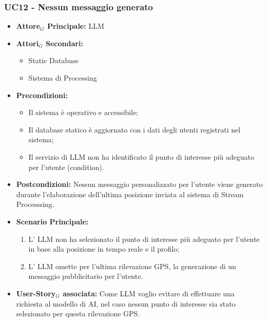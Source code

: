\documentclass[11pt]{article}
\begin{document}
\begin{justify}

\subsubsection{\textbf{UC12 - Nessun messaggio generato}}

\label{UC12}
\begin{itemize}
    \item \textbf{Attore$_G$ Principale:} LLM
    \item \textbf{Attori$_G$ Secondari:} 
    \begin{itemize}
        \item Static Database
        \item Sistema di Processing
    \end{itemize}
    \item \textbf{Precondizioni:} 
        \begin{itemize}
          \item Il sistema è operativo e accessibile;
          \item Il database statico è aggiornato con i dati degli utenti registrati nel sistema;
          \item Il servizio di LLM non ha identificato il punto di interesse più adeguato per l'utente (condition).
        \end{itemize}
      \item \textbf{Postcondizioni:} Nessun messaggio personalizzato per l'utente viene generato durante l'elaborazione dell'ultima posizione inviata al sistema di Stream Processsing.\\
    \item \textbf{Scenario Principale:} 
        \begin{enumerate}
        \item L' LLM non ha selezionato il punto di interesse più adeguato per l'utente in base alla posizione in tempo reale e il profilo;
        \item L' LLM omette per l'ultima rilevazione GPS, la generazione di un messaggio pubblicitario per l'utente.
        \end{enumerate}
    \item \textbf{User-Story$_G$ associata:} Come LLM voglio evitare di effettuare una richiesta al modello di AI, nel caso nessun punto di interesse sia stato selezionato per questa rilevazione GPS.
\end{itemize}


\end{justify}
\end{document}
